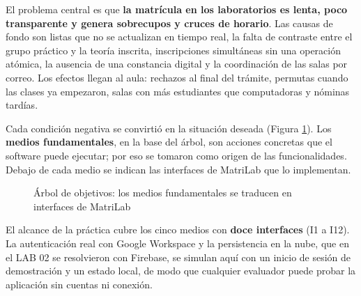 El problema central es que \textbf{la matrícula en los laboratorios es lenta, poco transparente y genera sobrecupos y cruces de horario}. Las causas de fondo son listas que no se actualizan en tiempo real, la falta de contraste entre el grupo práctico y la teoría inscrita, inscripciones simultáneas sin una operación atómica, la ausencia de una constancia digital y la coordinación de las salas por correo. Los efectos llegan al aula: rechazos al final del trámite, permutas cuando las clases ya empezaron, salas con más estudiantes que computadoras y nóminas tardías.

\vspace{0.2cm}

Cada condición negativa se convirtió en la situación deseada (Figura \ref{fig:arbol_objetivos}). Los \textbf{medios fundamentales}, en la base del árbol, son acciones concretas que el software puede ejecutar; por eso se tomaron como origen de las funcionalidades. Debajo de cada medio se indican las interfaces de MatriLab que lo implementan.

\begin{figure}[!htbp]
\centering
{}
\caption{Árbol de objetivos: los medios fundamentales se traducen en interfaces de MatriLab}
\label{fig:arbol_objetivos}
\end{figure}

El alcance de la práctica cubre los cinco medios con \textbf{doce interfaces} (I1 a I12). La autenticación real con Google Workspace y la persistencia en la nube, que en el LAB 02 se resolvieron con Firebase, se simulan aquí con un inicio de sesión de demostración y un estado local, de modo que cualquier evaluador puede probar la aplicación sin cuentas ni conexión.

\vspace{0.2cm}

